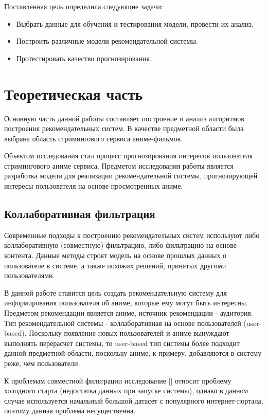\documentclass[bachelor, och, diploma]{SCWorks}
\begin{document}
Поставленная цель определила следующие задачи:
\begin{itemize}
	\item Выбрать данные для обучения и тестирования модели, провести их анализ.
	\item Построить различные модели рекомендательной системы.
	\item Протестировать качество прогнозирования.
\end{itemize}

\section{Теоретическая часть}
Основную часть данной работы составляет построение и анализ алгоритмов построения рекомендательных систем. В качестве предметной области была выбрана область стримингового сервиса аниме-фильмов.

Объектом исследования стал процесс прогнозирования интересов пользователя стримингового аниме сервиса. Предметом исследования работы является разработка модели для реализации рекомендательной системы, прогнозирующей интересы пользователя на основе просмотренных аниме.

\subsection{Коллаборативная фильтрация}
Современные подходы к построению рекомендательных систем используют либо коллаборативную (совместную) фильтрацию, либо фильтрацию на основе контента. Данные методы строят модель на основе прошлых данных о пользователе в системе, а также похожих решений, принятых другими пользователями.

В данной работе ставится цель создать рекомендательную систему для информирования пользователя об аниме, которые ему могут быть интересны. Предметом рекомендации является аниме, источник рекомендации - аудитория. Тип рекомендательной системы - коллаборативная на основе пользователей (user-based). Поскольку появление новых пользователей и аниме вынуждают выполнять перерасчет системы, то user-based тип системы более подходит данной предметной области, поскольку аниме, к примеру, добавляются в систему реже, чем пользователи.

К проблемам совместной фильтрации исследование [] относит проблему холодного старта (недостатка данных при запуске системы), однако в данном случае используется начальный большой датасет с популярного интернет-портала, поэтому данная проблема несущественна.
\end{document}
